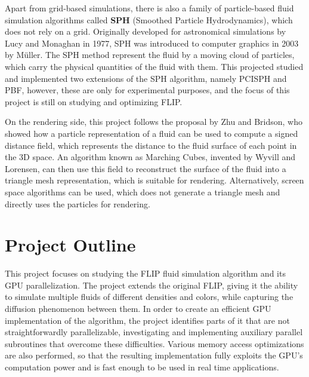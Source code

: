 Apart from grid-based simulations, there is also a family of particle-based fluid simulation algorithms called \textbf{SPH} (Smoothed Particle Hydrodynamics), which does not rely on a grid. Originally developed for astronomical simulations by Lucy\cite{lucy1977numerical} and Monaghan \cite{monaghan1992smoothed} in 1977, SPH was introduced to computer graphics in 2003 by Müller\cite{muller2003particle}. The SPH method represent the fluid by a moving cloud of particles, which carry the physical quantities of the fluid with them. This projected studied and implemented two extensions of the SPH algorithm, namely PCISPH\cite{solenthaler2009predictive} and PBF\cite{macklin2013position}, however, these are only for experimental purposes, and the focus of this project is still on studying and optimizing FLIP.

On the rendering side, this project follows the proposal by Zhu and Bridson\cite{zhu2005animating}, who showed how a particle representation of a fluid can be used to compute a signed distance field, which represents the distance to the fluid surface of each point in the 3D space. An algorithm known as Marching Cubes, invented by Wyvill\cite{wyvill1986soft} and Lorensen\cite{lorensen1987marching}, can then use this field to reconstruct the surface of the fluid into a triangle mesh representation, which is suitable for rendering. Alternatively, screen space algorithms\cite{van2009screen} can be used, which does not generate a triangle mesh and directly uses the particles for rendering.



\section{Project Outline}


This project focuses on studying the FLIP fluid simulation algorithm and its GPU parallelization. The project extends the original FLIP, giving it the ability to simulate multiple fluids of different densities and colors, while capturing the diffusion phenomenon between them. In order to create an efficient GPU implementation of the algorithm, the project identifies parts of it that are not straightforwardly parallelizable, investigating and implementing auxiliary parallel subroutines that overcome these difficulties. Various memory access optimizations are also performed, so that the resulting implementation fully exploits the GPU's computation power and is fast enough to be used in real time applications.


